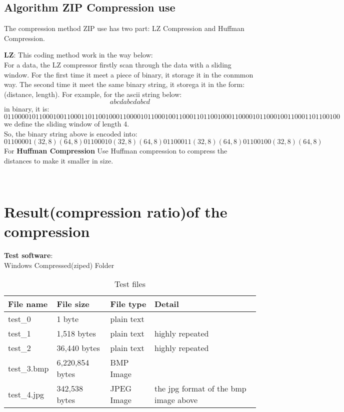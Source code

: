 \documentclass{article}
\begin{document}
\subsection{Algorithm ZIP Compression use}
	The compression method ZIP use has two part: LZ Compression and Huffman Compression.

	\textbf{LZ}:
		This coding method work in the way below: \\
		For a data, the LZ compressor firstly scan through the data with a sliding window. For the first time it meet a piece of binary, it storage it in the conmmon way. The second time it meet the same binary string, it storega it in the form: (distance, length). For example, for the ascii string below: \\
		$$abcdabcdabcd$$
		in binary, it is:
		$$01100001 01100010 01100011 01100100 01100001 01100010 01100011 01100100 01100001 01100010 01100011 01100100$$
		we define the sliding window of length 4. \\
		So, the binary string above is encoded into:
		$$01100001(32,8)(64,8) 01100010(32,8)(64,8) 01100011(32,8)(64,8) 01100100(32,8)(64,8)$$
		For
	\textbf{Huffman Compression}
		Use Huffman compression to compress the distances to make it smaller in size.

	\\ \cite{ref5}


\newpage

\section{Result(compression ratio)of the compression}
	\textbf{Test software}: \\
		Windows Compressed(ziped) Folder \\
\begin{table}[]
    \caption{Test files}
	\begin{tabular}{|l|l|l|l|}
	\hline
	File name   & File size       & File type  & Detail                                \\ \hline
	test\_0     & 1 byte         & plain text &                                       \\ \hline
	test\_1     & 1,518 bytes     & plain text & highly repeated                       \\ \hline
	test\_2     & 36,440 bytes    & plain text & highly repeated                       \\ \hline
	test\_3.bmp & 6,220,854 bytes & BMP Image  &                                       \\ \hline
	test\_4.jpg & 342,538 bytes   & JPEG Image & the jpg format of the bmp image above \\ \hline
	\end{tabular}
\end{table}
\end{document}
